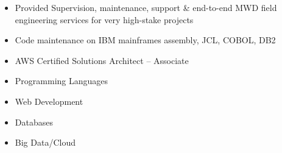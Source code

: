 \documentclass[10pt,a4paper,ragged2e,withhyper]{altacv}
\begin{document}
\begin{paracol}{2}
\divider

\begin{itemize}
\item Provided Supervision, maintenance, support \& end-to-end MWD field engineering services for very high-stake projects
\end{itemize}

\divider

\begin{itemize}
\item Code maintenance on IBM mainframes assembly, JCL, COBOL, DB2 
\end{itemize}

\newpage

\switchcolumn

\begin{itemize}
\item AWS Certified Solutions Architect – Associate                           
\end{itemize}



\begin{itemize}
\item \textcolor{emphasis}{Programming Languages} 
\end{itemize}

\vskip 0.2cm

\begin{itemize}
\item \textcolor{emphasis}{Web Development} 
\end{itemize}

\vskip 0.2cm

\begin{itemize}
\item \textcolor{emphasis}{Databases} 
\end{itemize}


\begin{itemize}
\item \textcolor{emphasis}{Big Data/Cloud} 
\end{itemize}


\end{paracol}
\end{document}
